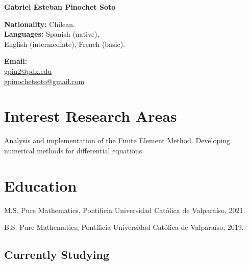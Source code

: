 \documentclass[12pt,letterpaper]{report}
\newcommand{\myname}{Gabriel Esteban Pinochet Soto}
\newcommand{\namefont}[1]{{\normalfont\bfseries\Huge{#1}}}
\begin{document}
    \raggedright{}

    \namefont{\myname}

    \vspace{1em}
    \begin{minipage}[t]{0.55\textwidth}
        {\bf Nationality:} Chilean.\\
        {\bf Languages:} Spanish (native), \\English (intermediate), French (basic). \\
    \end{minipage}
    \begin{minipage}[t]{0.4\textwidth}
        {\bf Email:}\\
        \href{mailto:gpin2@pdx.edu}{gpin2@pdx.edu}\\
        \href{mailto:gpinochetsoto@gmail.com}{gpinochetsoto@gmail.com}\\
    \end{minipage}

    \section*{Interest Research Areas}

    Analysis and implementation of the Finite Element Method. Developing numerical methods for differential equations. 
    
    \section*{Education}

    \begin{tablist}
        \item[M.S.]  \tab Pure Mathematics, Pontificia Universidad Cat\'olica de Valpara\'iso, 2021.
        \item[B.S.]  \tab Pure Mathematics, Pontificia Universidad Cat\'olica de Valpara\'iso, 2019.
    \end{tablist}

    \subsection*{Currently Studying}
\end{document}
